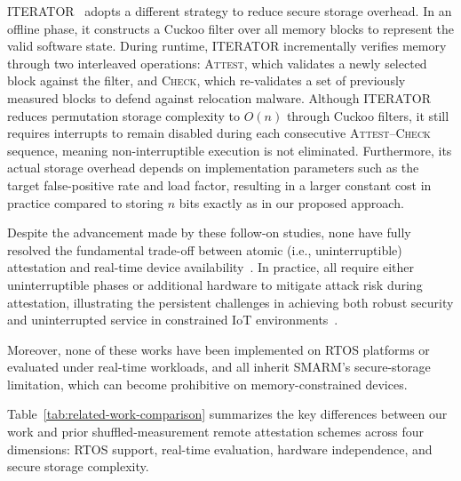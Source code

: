 \documentclass[a4paper,10pt]{article}
\begin{document}
{ITERATOR~\cite{sponziello2025iterator} adopts a different strategy to reduce 
secure storage overhead. In an offline phase, it constructs a Cuckoo filter over all 
memory blocks to represent the valid software state. During runtime, ITERATOR 
incrementally verifies memory through two interleaved operations: \textsc{Attest}, 
which validates a newly selected block against the filter, and \textsc{Check}, which 
re-validates a set of previously measured blocks to defend against relocation malware. 
Although ITERATOR reduces permutation storage complexity to $O(n)$ through 
Cuckoo filters, it still requires interrupts to remain disabled during each consecutive 
\textsc{Attest}--\textsc{Check} sequence, meaning non-interruptible execution is not 
eliminated. Furthermore, its actual storage overhead depends on implementation 
parameters such as the target false-positive rate and load factor, resulting in a larger 
constant cost in practice compared to storing $n$ bits exactly as in our proposed 
approach.

Despite the advancement made by these follow-on studies, none have fully resolved 
the fundamental trade-off between atomic (i.e., uninterruptible) attestation and 
real-time device availability~\cite{aman2021prom,aman2018hatt}. In practice, all 
require either uninterruptible phases or additional hardware to mitigate attack risk 
during attestation, illustrating the persistent challenges in achieving both robust 
security and uninterrupted service in constrained IoT 
environments~\cite{carpent2018smarm,aman2021prom,aman2018hatt}. 
{Moreover, none of these works have been implemented on RTOS platforms 
or evaluated under real-time workloads, and all inherit SMARM's secure-storage 
limitation, which can become prohibitive on memory-constrained devices.


Table~\ref{tab:related-work-comparison} summarizes the key differences 
between our work and prior shuffled-measurement remote attestation schemes 
across four dimensions: RTOS support, real-time evaluation, hardware independence, 
and secure storage complexity.

}}
\end{document}
